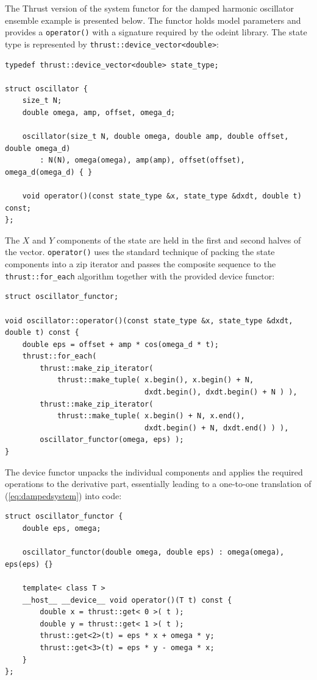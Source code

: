\documentclass[final]{siamltex}
\newcommand{\code}[1]{\lstinline|#1|}
\newcommand{\eqref}[1]{(\ref{#1})}
\begin{document}
The Thrust version of the system functor for the damped harmonic oscillator
ensemble example is presented below. The functor holds model parameters and
provides a \code{operator()} with a signature required by the odeint library. The
state type is represented by \code{thrust::device_vector<double>}:
\begin{lstlisting}
typedef thrust::device_vector<double> state_type;

struct oscillator {
    size_t N;
    double omega, amp, offset, omega_d;

    oscillator(size_t N, double omega, double amp, double offset, double omega_d)
        : N(N), omega(omega), amp(amp), offset(offset), omega_d(omega_d) { }

    void operator()(const state_type &x, state_type &dxdt, double t) const;
};
\end{lstlisting}
The $X$ and $Y$ components of the state are held in the first and second halves of the
vector.  \code{operator()} uses the standard technique of
packing the state components into a zip iterator and passes the composite
sequence to the \code{thrust::for_each} algorithm together with the provided device
functor:
\begin{lstlisting}[firstnumber=12]
struct oscillator_functor;

void oscillator::operator()(const state_type &x, state_type &dxdt, double t) const {
    double eps = offset + amp * cos(omega_d * t);
    thrust::for_each(
        thrust::make_zip_iterator(
            thrust::make_tuple( x.begin(), x.begin() + N,
                                dxdt.begin(), dxdt.begin() + N ) ),
        thrust::make_zip_iterator(
            thrust::make_tuple( x.begin() + N, x.end(),
                                dxdt.begin() + N, dxdt.end() ) ),
        oscillator_functor(omega, eps) );
}
\end{lstlisting}
The device functor unpacks the individual components and applies the required
operations to the derivative part, essentially leading to a one-to-one translation of \eqref{eq:dampedsystem} into code:
\begin{lstlisting}[firstnumber=last]
struct oscillator_functor {
    double eps, omega;

    oscillator_functor(double omega, double eps) : omega(omega), eps(eps) {}

    template< class T >
    __host__ __device__ void operator()(T t) const {
        double x = thrust::get< 0 >( t );
        double y = thrust::get< 1 >( t );
        thrust::get<2>(t) = eps * x + omega * y;
        thrust::get<3>(t) = eps * y - omega * x;
    }
};
\end{lstlisting}
\end{document}
